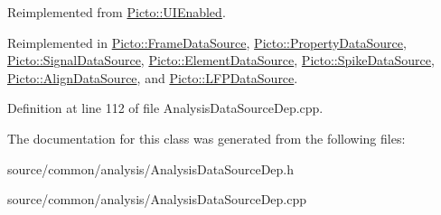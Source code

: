 Reimplemented from \hyperlink{class_picto_1_1_u_i_enabled_ae1585113a496ff2c8de3293aa884b57b}{Picto\-::\-U\-I\-Enabled}.



Reimplemented in \hyperlink{class_picto_1_1_frame_data_source_a4e96fe48935f89dadedb100fd35ef9f6}{Picto\-::\-Frame\-Data\-Source}, \hyperlink{class_picto_1_1_property_data_source_a8370e743f3590aeee82486757d2df307}{Picto\-::\-Property\-Data\-Source}, \hyperlink{class_picto_1_1_signal_data_source_a1ed324bf825b1967283042624c70d820}{Picto\-::\-Signal\-Data\-Source}, \hyperlink{class_picto_1_1_element_data_source_a8a7867cdc6d572fd167ac0b554935d41}{Picto\-::\-Element\-Data\-Source}, \hyperlink{class_picto_1_1_spike_data_source_aa0265d8bab873ee4e3b84a2150ce36e5}{Picto\-::\-Spike\-Data\-Source}, \hyperlink{class_picto_1_1_align_data_source_ac13d9419b22333299c93daa964b0d855}{Picto\-::\-Align\-Data\-Source}, and \hyperlink{class_picto_1_1_l_f_p_data_source_a4f1fcdb1684600a267ae897cf5799e48}{Picto\-::\-L\-F\-P\-Data\-Source}.



Definition at line 112 of file Analysis\-Data\-Source\-Dep.\-cpp.



The documentation for this class was generated from the following files\-:\begin{DoxyCompactItemize}
\item 
source/common/analysis/Analysis\-Data\-Source\-Dep.\-h\item 
source/common/analysis/Analysis\-Data\-Source\-Dep.\-cpp\end{DoxyCompactItemize}
